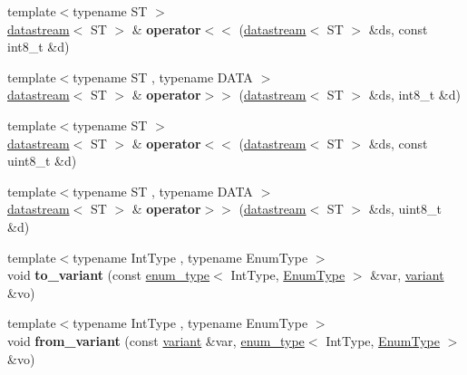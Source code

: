 \begin{DoxyCompactItemize}
\item 
\mbox{\label{namespacefc_affbdf38b9e1d2a6ba7168e8bbfda6c77}} 
{\footnotesize template$<$typename ST $>$ }\\\mbox{\hyperlink{classfc_1_1datastream}{datastream}}$<$ ST $>$ \& {\bfseries operator$<$$<$} (\mbox{\hyperlink{classfc_1_1datastream}{datastream}}$<$ ST $>$ \&ds, const int8\+\_\+t \&d)
\item 
\mbox{\label{namespacefc_a8a38d2593faa17c079f25e5326502482}} 
{\footnotesize template$<$typename ST , typename D\+A\+TA $>$ }\\\mbox{\hyperlink{classfc_1_1datastream}{datastream}}$<$ ST $>$ \& {\bfseries operator$>$$>$} (\mbox{\hyperlink{classfc_1_1datastream}{datastream}}$<$ ST $>$ \&ds, int8\+\_\+t \&d)
\item 
\mbox{\label{namespacefc_a94ea8409757254c9619b69efaf54c2e9}} 
{\footnotesize template$<$typename ST $>$ }\\\mbox{\hyperlink{classfc_1_1datastream}{datastream}}$<$ ST $>$ \& {\bfseries operator$<$$<$} (\mbox{\hyperlink{classfc_1_1datastream}{datastream}}$<$ ST $>$ \&ds, const uint8\+\_\+t \&d)
\item 
\mbox{\label{namespacefc_a655d22296403cb8f10d520f07305f37c}} 
{\footnotesize template$<$typename ST , typename D\+A\+TA $>$ }\\\mbox{\hyperlink{classfc_1_1datastream}{datastream}}$<$ ST $>$ \& {\bfseries operator$>$$>$} (\mbox{\hyperlink{classfc_1_1datastream}{datastream}}$<$ ST $>$ \&ds, uint8\+\_\+t \&d)
\item 
\mbox{\label{namespacefc_a36519bb570aeec8d85dacb00825ccc1e}} 
{\footnotesize template$<$typename Int\+Type , typename Enum\+Type $>$ }\\void {\bfseries to\+\_\+variant} (const \mbox{\hyperlink{classfc_1_1enum__type}{enum\+\_\+type}}$<$ Int\+Type, \mbox{\hyperlink{struct_enum_type}{Enum\+Type}} $>$ \&var, \mbox{\hyperlink{classfc_1_1variant}{variant}} \&vo)
\item 
\mbox{\label{namespacefc_ac36e8d6cf0055b6a9599c89cf17bdb97}} 
{\footnotesize template$<$typename Int\+Type , typename Enum\+Type $>$ }\\void {\bfseries from\+\_\+variant} (const \mbox{\hyperlink{classfc_1_1variant}{variant}} \&var, \mbox{\hyperlink{classfc_1_1enum__type}{enum\+\_\+type}}$<$ Int\+Type, \mbox{\hyperlink{struct_enum_type}{Enum\+Type}} $>$ \&vo)

\end{DoxyCompactItemize}

